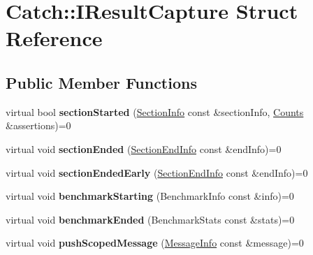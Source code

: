 \hypertarget{structCatch_1_1IResultCapture}{}\section{Catch\+:\+:I\+Result\+Capture Struct Reference}
\label{structCatch_1_1IResultCapture}
\subsection*{Public Member Functions}
\begin{DoxyCompactItemize}
\item 
virtual bool {\bfseries section\+Started} (\hyperlink{structCatch_1_1SectionInfo}{Section\+Info} const \&section\+Info, \hyperlink{structCatch_1_1Counts}{Counts} \&assertions)=0\hypertarget{structCatch_1_1IResultCapture_a5b76ed52badcb64cf374202e12b81a03}{}\label{structCatch_1_1IResultCapture_a5b76ed52badcb64cf374202e12b81a03}

\item 
virtual void {\bfseries section\+Ended} (\hyperlink{structCatch_1_1SectionEndInfo}{Section\+End\+Info} const \&end\+Info)=0\hypertarget{structCatch_1_1IResultCapture_a4e152bc43dc0933684e31fa67a58195d}{}\label{structCatch_1_1IResultCapture_a4e152bc43dc0933684e31fa67a58195d}

\item 
virtual void {\bfseries section\+Ended\+Early} (\hyperlink{structCatch_1_1SectionEndInfo}{Section\+End\+Info} const \&end\+Info)=0\hypertarget{structCatch_1_1IResultCapture_afcc71eef8ca821ae132cced4a2be6988}{}\label{structCatch_1_1IResultCapture_afcc71eef8ca821ae132cced4a2be6988}

\item 
virtual void {\bfseries benchmark\+Starting} (Benchmark\+Info const \&info)=0\hypertarget{structCatch_1_1IResultCapture_a264ae12330c74b2daae41715a30d51bf}{}\label{structCatch_1_1IResultCapture_a264ae12330c74b2daae41715a30d51bf}

\item 
virtual void {\bfseries benchmark\+Ended} (Benchmark\+Stats const \&stats)=0\hypertarget{structCatch_1_1IResultCapture_a6e5e64f9d94211a888249012ab6cc7fb}{}\label{structCatch_1_1IResultCapture_a6e5e64f9d94211a888249012ab6cc7fb}

\item 
virtual void {\bfseries push\+Scoped\+Message} (\hyperlink{structCatch_1_1MessageInfo}{Message\+Info} const \&message)=0\hypertarget{structCatch_1_1IResultCapture_a91d154c1e087e383dcde5aad95cb6a05}{}\label{structCatch_1_1IResultCapture_a91d154c1e087e383dcde5aad95cb6a05}


\end{DoxyCompactItemize}
